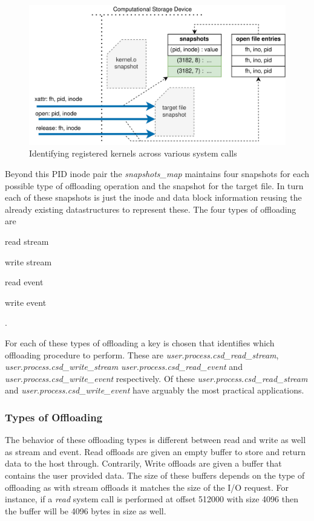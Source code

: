 \begin{figure}
    \centering
	\includegraphics[width=1\textwidth]{resources/images/offloading-management.png}
	\caption{Identifying registered kernels across various system calls}
    \label{figure:offloadingmanagement}
\end{figure}

Beyond this PID inode pair the \textit{snapshots\_map} maintains four snapshots
for each possible type of offloading operation and the snapshot for the target
file. In turn each of these snapshots is just the inode and data block
information reusing the already existing datastructures to represent these.
The four types of offloading are \begin{enumerate*} \item read stream
\item write stream \item read event \item write event \end{enumerate*}.

For each of these types of offloading a key is chosen that identifies which
offloading procedure to perform. These are
\textit{user.process.csd\_read\_stream},
\textit{user.process.csd\_write\_stream} \textit{user.process.csd\_read\_event}
and \textit{user.process.csd\_write\_event} respectively. Of these
\textit{user.process.csd\_read\_stream} and
\textit{user.process.csd\_write\_event} have arguably the most practical 
applications.

\subsubsection{Types of Offloading}

The behavior of these offloading types is different between read and write as
well as stream and event. Read offloads are given an empty buffer to store and
return data to the host through. Contrarily, Write offloads are given a buffer
that contains the user provided data. The size of these buffers depends on the
type of offloading as with stream offloads it matches the size of the I/O
request. For instance, if a \textit{read} system call is performed at offset
512000 with size 4096 then the buffer will be 4096 bytes in size as well.

